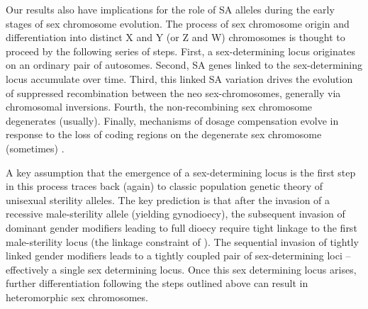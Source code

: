 \documentclass{article}
\begin{document}
Our results also have implications for the role of SA alleles during the early stages of sex chromosome evolution. The process of sex chromosome origin and differentiation into distinct X and Y (or Z and W) chromosomes is thought to proceed by the following series of steps. First, a sex-determining locus originates on an ordinary pair of autosomes. Second, SA genes linked to the sex-determining locus accumulate over time. Third, this linked SA variation drives the evolution of suppressed recombination between the neo sex-chromosomes, generally via chromosomal inversions. Fourth, the non-recombining sex chromosome degenerates (usually). Finally, mechanisms of dosage compensation evolve in response to the loss of coding regions on the degenerate sex chromosome (sometimes) \citep{Rice1987,Charlesworth2002,CharlesworthEtAl2005,Bachtrog2006,Qiuetal2013,Bachtrog2014}. 

A key assumption that the emergence of a sex-determining locus is the first step in this process traces back (again) to classic population genetic theory of unisexual sterility alleles. The key prediction is that after the invasion of a recessive male-sterility allele (yielding gynodioecy), the subsequent invasion of dominant gender modifiers leading to full dioecy require tight linkage to the first male-sterility locus (the linkage constraint of \citealt{Charlesworth1978a}). The sequential invasion of tightly linked gender modifiers leads to a tightly coupled pair of sex-determining loci -- effectively a single sex determining locus. Once this sex determining locus arises, further differentiation following the steps outlined above can result in heteromorphic sex chromosomes.
\end{document}
